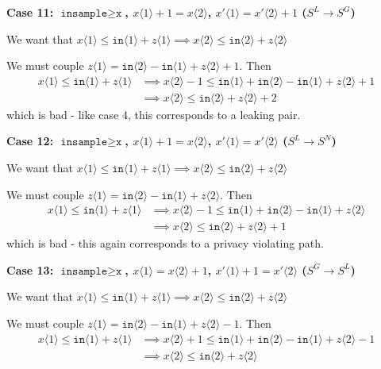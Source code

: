 \documentclass[12pt]{article}
\newcommand{\gguard}[1][x]{\texttt{insample}\geq \texttt{#1}}
\newcommand{\brangle}[1]{\langle #1 \rangle}
\theoremstyle{definition}
\begin{document}
\textbf{Case 11: $\gguard$, $x\brangle{1}  + 1= x \brangle{2}$, $x'\brangle{1} = x' \brangle{2}+1$ ($S^L\to S^G$)}

We want that $x\langle 1 \rangle \leq \texttt{in}\langle 1\rangle + z\brangle{1}\implies x \brangle{2} \leq \texttt{in}\brangle{2} + z\brangle{2}$

We must couple $z\brangle{1} =\texttt{in}\brangle{2}-\texttt{in}\brangle{1} +z\brangle{2}+1$.
Then \begin{align*}
	x\langle 1 \rangle \leq \texttt{in}\langle 1\rangle + z\brangle{1}&\implies x\brangle{2}-1 \leq \texttt{in}\brangle{1} + \texttt{in}\brangle{2}-\texttt{in}\brangle{1} +z\brangle{2}+1\\
	&\implies x\brangle{2} \leq \texttt{in}\brangle{2} + z\brangle{2}+2
\end{align*}
which is bad - like case 4, this corresponds to a leaking pair.

\textbf{Case 12: $\gguard$, $x\brangle{1}  + 1= x \brangle{2}$, $x'\brangle{1} = x' \brangle{2}$ ($S^L\to S^N$)}

We want that $x\langle 1 \rangle \leq \texttt{in}\langle 1\rangle + z\brangle{1}\implies x \brangle{2} \leq \texttt{in}\brangle{2} + z\brangle{2}$

We must couple $z\brangle{1} =\texttt{in}\brangle{2}-\texttt{in}\brangle{1} +z\brangle{2}$.
Then \begin{align*}
	x\langle 1 \rangle \leq \texttt{in}\langle 1\rangle + z\brangle{1}&\implies x\brangle{2}-1 \leq \texttt{in}\brangle{1} + \texttt{in}\brangle{2}-\texttt{in}\brangle{1} +z\brangle{2}\\
	&\implies x\brangle{2} \leq \texttt{in}\brangle{2} + z\brangle{2}+1
\end{align*}
which is bad - this again corresponds to a privacy violating path. 

\textbf{Case 13: $\gguard$, $x\brangle{1}  = x \brangle{2}+1$, $x'\brangle{1}+1 = x' \brangle{2}$ ($S^G\to S^L$)}

We want that $x\langle 1 \rangle \leq \texttt{in}\langle 1\rangle + z\brangle{1}\implies x \brangle{2} \leq \texttt{in}\brangle{2} + z\brangle{2}$

We must couple $z\brangle{1} =\texttt{in}\brangle{2}-\texttt{in}\brangle{1} +z\brangle{2}-1$.
Then \begin{align*}
	x\langle 1 \rangle \leq \texttt{in}\langle 1\rangle + z\brangle{1}&\implies x\brangle{2}+1 \leq \texttt{in}\brangle{1} + \texttt{in}\brangle{2}-\texttt{in}\brangle{1} +z\brangle{2}-1\\
	&\implies x\brangle{2} \leq \texttt{in}\brangle{2} + z\brangle{2}
\end{align*}
\end{document}
